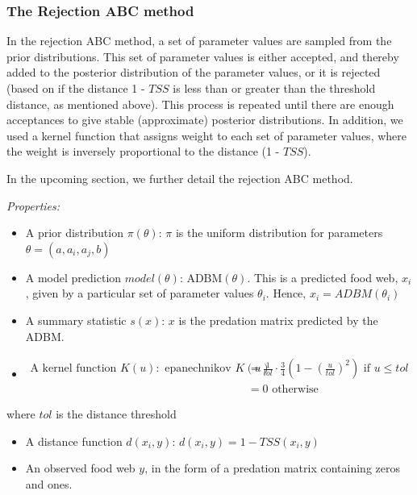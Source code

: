 \documentclass{article}
\begin{document}
\hypertarget{the-rejection-abc-method}{%
\subsubsection{The Rejection ABC
method}\label{the-rejection-abc-method}}

In the rejection ABC method, a set of parameter values are sampled from
the prior distributions. This set of parameter values is either
accepted, and thereby added to the posterior distribution of the
parameter values, or it is rejected (based on if the distance 1 -
\(TSS\) is less than or greater than the threshold distance, as
mentioned above). This process is repeated until there are enough
acceptances to give stable (approximate) posterior distributions. In
addition, we used a kernel function that assigns weight to each set of
parameter values, where the weight is inversely proportional to the
distance (1 - \(TSS\)).

In the upcoming section, we further detail the rejection ABC method.

\emph{Properties:}

\begin{itemize}
\item
  A prior distribution \(\pi(\theta)\): \(\pi\) is the uniform
  distribution for parameters \(\theta = (a, a_i, a_j, b)\)
\item
  A model prediction \(model(\theta)\): ADBM\((\theta)\). This is a
  predicted food web, \(x_i\), given by a particular set of parameter
  values \(\theta_i\). Hence, \(x_i = ADBM(\theta_i)\)
\item
  A summary statistic \(s(x)\): \(x\) is the predation matrix predicted
  by the ADBM.
\item
  \(\begin{aligned} \text{A kernel function } K(u): \text{ epanechnikov } K(u) &= \frac{1}{tol}\cdot\frac{3}{4}(1-(\frac{u}{tol})^2) \text{ if } u \leq tol \\ &= 0 \text{ otherwise} \end{aligned}\)
\end{itemize}

where \(tol\) is the distance threshold

\begin{itemize}
\item
  A distance function \(d(x_i,y)\): \(d(x_i,y) = 1 - TSS(x_i,y)\)
\item
  An observed food web \(y\), in the form of a predation matrix
  containing zeros and ones.
\end{itemize}
\end{document}
